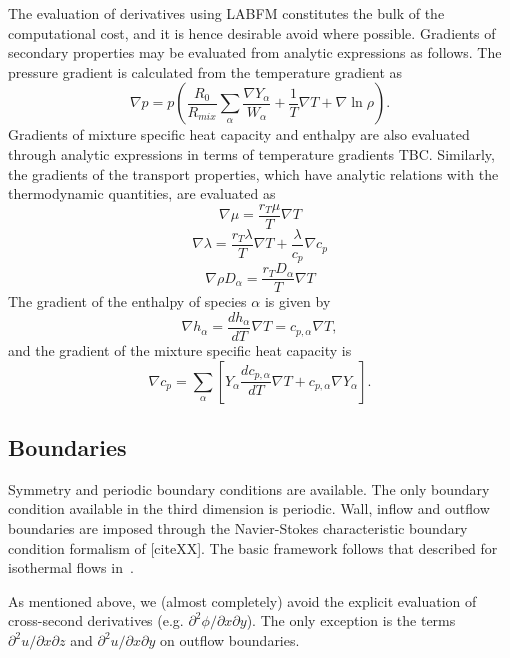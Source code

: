 \documentclass[notitlepage]{revtex4-1}
\begin{document}
The evaluation of derivatives using LABFM constitutes the bulk of the computational cost, and it is hence desirable avoid where possible. Gradients of secondary properties may be evaluated from analytic expressions as follows. The pressure gradient is calculated from the temperature gradient as 
\begin{equation}\nabla{p}=p\left(\frac{R_{0}}{R_{mix}}\displaystyle\sum_{\alpha}\frac{\nabla{Y}_{\alpha}}{W_{\alpha}}+\frac{1}{T}\nabla{T}+\nabla\ln\rho\right).\label{eq:gradp}\end{equation}
Gradients of mixture specific heat capacity and enthalpy are also evaluated through analytic expressions in terms of temperature gradients TBC.
Similarly, the gradients of the transport properties, which have analytic relations with the thermodynamic quantities, are evaluated as
\begin{equation}\nabla\mu=\frac{r_{T}\mu}{T}\nabla{T}\end{equation}
\begin{equation}\nabla\lambda=\frac{r_{T}\lambda}{T}\nabla{T}+\frac{\lambda}{c_{p}}\nabla{c_{p}}\end{equation}
\begin{equation}\nabla\rho{D}_{\alpha}=\frac{r_{T}D_{\alpha}}{T}\nabla{T}\end{equation}
The gradient of the enthalpy of species $\alpha$ is given by
\begin{equation}\nabla{h}_{\alpha}=\frac{dh_{\alpha}}{dT}\nabla{T}=c_{p,\alpha}\nabla{T},\end{equation}
and the gradient of the mixture specific heat capacity is
\begin{equation}\nabla{c}_{p}=\displaystyle\sum_{\alpha}\left[Y_{\alpha}\frac{dc_{p,\alpha}}{dT}\nabla{T}+c_{p,\alpha}\nabla{Y}_{\alpha}\right].\end{equation}

\subsection{Boundaries}

Symmetry and periodic boundary conditions are available. The only boundary condition available in the third dimension is periodic. Wall, inflow and outflow boundaries are imposed through the Navier-Stokes characteristic boundary condition formalism of [citeXX]. The basic framework follows that described for isothermal flows in~\cite{king_labfm_2022}.

As mentioned above, we (almost completely) avoid the explicit evaluation of cross-second derivatives (e.g. $\partial^{2}\phi/\partial{x}\partial{y}$). The only exception is the terms $\partial^{2}u/\partial{x}\partial{z}$ and $\partial^{2}u/\partial{x}\partial{y}$ on outflow boundaries.
\end{document}
